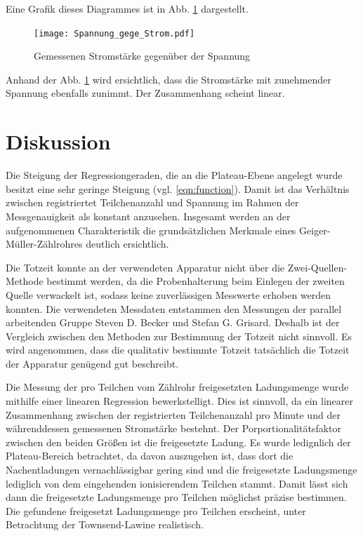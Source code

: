 Eine Grafik dieses Diagrammes ist in Abb. \ref{fig:Spannung gegen Strom}
dargestellt.

\begin{figure}
  \centering
  \texttt{[image: Spannung\_gege\_Strom.pdf]}
  \caption{Gemessenen Stromstärke gegenüber der Spannung}
  \label{fig:Spannung gegen Strom}
\end{figure}

Anhand der Abb. \ref{fig:Spannung gegen Strom} wird ersichtlich, dass die Stromstärke
mit zunehmender Spannung ebenfalls zunimmt. Der Zusammenhang scheint linear.

\section{Diskussion}

Die Steigung der Regressiongeraden, die an die Plateau-Ebene angelegt wurde
besitzt eine sehr geringe Steigung (vgl. \ref{eqn:function}).
Damit ist das Verhältnis zwischen registriertet Teilchenanzahl und Spannung
im Rahmen der Messgenauigkeit als konstant anzusehen. Insgesamt werden
an der aufgenommenen Charakteristik die grundsätzlichen Merkmale eines
Geiger-Müller-Zählrohres deutlich ersichtlich.

Die Totzeit konnte an der verwendeten Apparatur nicht über die Zwei-Quellen-Methode
bestimmt werden, da die Probenhalterung beim Einlegen der zweiten Quelle
verwackelt ist, sodass keine zuverlässigen Messwerte erhoben werden konnten.
Die verwendeten Messdaten entstammen den Messungen der parallel arbeitenden
Gruppe Steven D. Becker und Stefan G. Grisard.
Deshalb ist der Vergleich zwischen den Methoden zur Bestimmung der Totzeit
nicht sinnvoll. Es wird angenommen, dass die qualitativ bestimmte
Totzeit tatsächlich die Totzeit der Apparatur genügend gut beschreibt.

Die Messung der pro Teilchen vom Zählrohr freigesetzten Ladungsmenge wurde mithilfe
einer linearen Regression bewerkstelligt. Dies ist sinnvoll, da ein linearer
Zusammenhang zwischen der registrierten Teilchenanzahl pro Minute und der
währenddessen gemessenen Stromstärke bestehnt.
Der Porportionalitätsfaktor zwischen den beiden Größen ist die freigesetzte
Ladung. Es wurde ledignlich der Plateau-Bereich betrachtet, da davon auszugehen
ist, dass dort die Nachentladungen vernachlässigbar gering sind und die
freigesetzte Ladungsmenge lediglich von dem eingehenden ionisierendem
Teilchen stammt. Damit lässt sich dann die freigesetzte Ladungsmenge pro Teilchen
möglichst präzise bestimmen. Die gefundene freigesetzt Ladungsmenge pro Teilchen
erscheint, unter Betrachtung der Townsend-Lawine realistisch.


